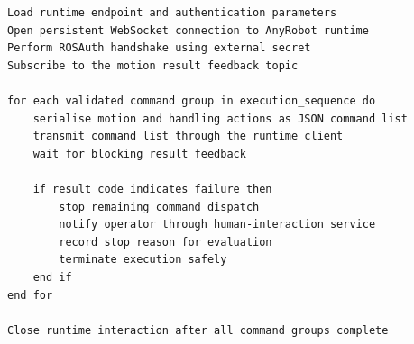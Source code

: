 \begin{lstlisting}[caption={Pseudocode for runtime command dispatch and result handling.}, label={lst:runtime-command-dispatch}]
Load runtime endpoint and authentication parameters
Open persistent WebSocket connection to AnyRobot runtime
Perform ROSAuth handshake using external secret
Subscribe to the motion result feedback topic

for each validated command group in execution_sequence do
    serialise motion and handling actions as JSON command list
    transmit command list through the runtime client
    wait for blocking result feedback

    if result code indicates failure then
        stop remaining command dispatch
        notify operator through human-interaction service
        record stop reason for evaluation
        terminate execution safely
    end if
end for

Close runtime interaction after all command groups complete
\end{lstlisting}
